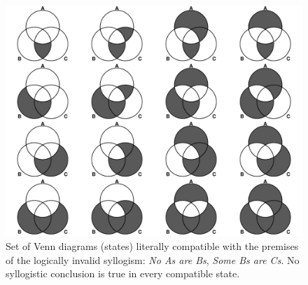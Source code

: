 \documentclass[floatsintext, doc]{apa6}
\begin{document}
\begin{figure}[t]
\centering
\includegraphics[width = \textwidth]{figs/diagrams_noneAB_someBC.pdf}
\caption{Set of Venn diagrams (states) literally compatible with the premises of the logically invalid syllogism: \emph{No As are Bs}, \emph{Some Bs are Cs}. No syllogistic conclusion is true in every compatible state.}
\label{fig:EIvenns}
\end{figure}



\end{document}
